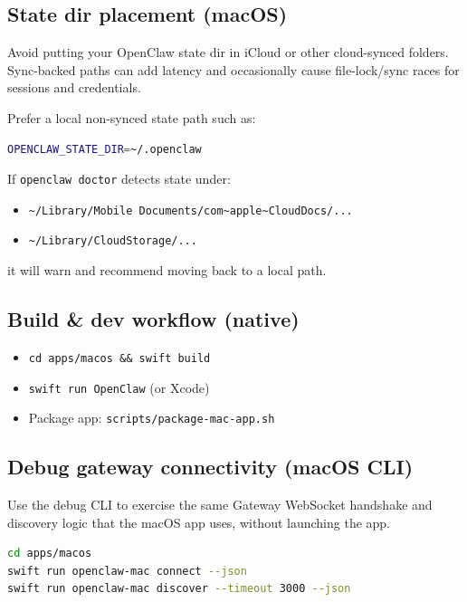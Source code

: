 \subsection{State dir placement (macOS)}


Avoid putting your OpenClaw state dir in iCloud or other cloud-synced folders.
Sync-backed paths can add latency and occasionally cause file-lock/sync races for
sessions and credentials.

Prefer a local non-synced state path such as:

\begin{lstlisting}[language=bash]
OPENCLAW_STATE_DIR=~/.openclaw
\end{lstlisting}


If \texttt{openclaw doctor} detects state under:

\begin{itemize}
  \item \texttt{\textasciitilde{}/Library/Mobile Documents/com\textasciitilde{}apple\textasciitilde{}CloudDocs/...}
  \item \texttt{\textasciitilde{}/Library/CloudStorage/...}
\end{itemize}


it will warn and recommend moving back to a local path.

\subsection{Build \& dev workflow (native)}


\begin{itemize}
  \item \texttt{cd apps/macos \&\& swift build}
  \item \texttt{swift run OpenClaw} (or Xcode)
  \item Package app: \texttt{scripts/package-mac-app.sh}
\end{itemize}


\subsection{Debug gateway connectivity (macOS CLI)}


Use the debug CLI to exercise the same Gateway WebSocket handshake and discovery
logic that the macOS app uses, without launching the app.

\begin{lstlisting}[language=bash]
cd apps/macos
swift run openclaw-mac connect --json
swift run openclaw-mac discover --timeout 3000 --json
\end{lstlisting}


